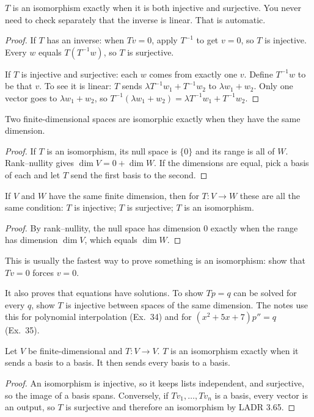 \documentclass[11pt]{scrartcl}
\begin{document}
\begin{theorem*}[LADR 3.63]
  $T$ is an isomorphism exactly when it is both injective and surjective.
  You never need to check separately that the inverse is linear. That is automatic.
\end{theorem*}
\begin{proof}
  If $T$ has an inverse: when $Tv=0$, apply $T^{-1}$ to get $v=0$, so $T$ is injective. Every $w$ equals $T(T^{-1}w)$, so $T$ is surjective.

  If $T$ is injective and surjective: each $w$ comes from exactly one $v$. Define $T^{-1}w$ to be that $v$.
  To see it is linear: $T$ sends $\lambda T^{-1}w_1+T^{-1}w_2$ to $\lambda w_1+w_2$. Only one vector goes to $\lambda w_1+w_2$, so $T^{-1}(\lambda w_1+w_2)=\lambda T^{-1}w_1+T^{-1}w_2$.
\end{proof}

\begin{theorem*}[LADR 3.70]
  Two finite-dimensional spaces are isomorphic exactly when they have the same dimension.
\end{theorem*}
\begin{proof}
  If $T$ is an isomorphism, its null space is $\{0\}$ and its range is all of $W$. Rank--nullity gives $\dim V=0+\dim W$.
  If the dimensions are equal, pick a basis of each and let $T$ send the first basis to the second.
\end{proof}

\begin{theorem*}[LADR 3.65]
  If $V$ and $W$ have the same finite dimension, then for $T\colon V\to W$ these are all the same condition:
  $T$ is injective; $T$ is surjective; $T$ is an isomorphism.
\end{theorem*}
\begin{proof}
  By rank--nullity, the null space has dimension $0$ exactly when the range has dimension $\dim V$, which equals $\dim W$.
\end{proof}
This is usually the fastest way to prove something is an isomorphism: show that $Tv=0$ forces $v=0$.

It also proves that equations have solutions. To show $Tp=q$ can be solved for every $q$, show $T$ is injective between spaces of the same dimension. The notes use this for polynomial interpolation (Ex.~34) and for $(x^2+5x+7)p''=q$ (Ex.~35).

\begin{proposition*}[HW4 P3]
  Let $V$ be finite-dimensional and $T\colon V\to V$.
  $T$ is an isomorphism exactly when it sends a basis to a basis. It then sends every basis to a basis.
\end{proposition*}
\begin{proof}
  An isomorphism is injective, so it keeps lists independent, and surjective, so the image of a basis spans.
  Conversely, if $Tv_1,\dots,Tv_n$ is a basis, every vector is an output, so $T$ is surjective and therefore an isomorphism by LADR 3.65.
\end{proof}
\end{document}
